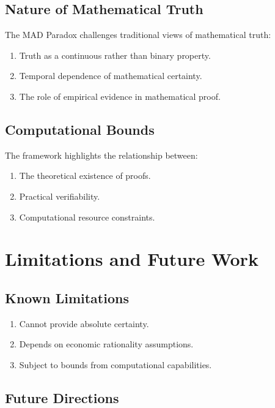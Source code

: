 \documentclass[11pt]{article}
\begin{document}
\subsection{Nature of Mathematical Truth}

The MAD Paradox challenges traditional views of mathematical truth:
\begin{enumerate}[label=(\arabic*)]
    \item Truth as a continuous rather than binary property.
    \item Temporal dependence of mathematical certainty.
    \item The role of empirical evidence in mathematical proof.
\end{enumerate}

\subsection{Computational Bounds}

The framework highlights the relationship between:
\begin{enumerate}[label=(\arabic*)]
    \item The theoretical existence of proofs.
    \item Practical verifiability.
    \item Computational resource constraints.
\end{enumerate}

\section{Limitations and Future Work}

\subsection{Known Limitations}

\begin{enumerate}[label=(\arabic*)]
    \item Cannot provide absolute certainty.
    \item Depends on economic rationality assumptions.
    \item Subject to bounds from computational capabilities.
\end{enumerate}

\subsection{Future Directions}
\end{document}
